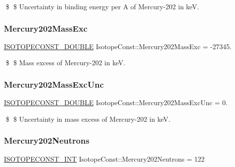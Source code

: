 \$ \$ Uncertainty in binding energy per A of Mercury-\/202 in keV. \mbox{\label{group___isotope_const-_mercury-_hg202_ga077138db374644ae16c107581ff498a1}} 
\subsubsection{\texorpdfstring{Mercury202\+Mass\+Exc}{Mercury202MassExc}}
{\footnotesize\ttfamily \mbox{\hyperlink{group___isotope_const-_macros_ga8f45a7272ce02c0b4c65c44636ed719a}{I\+S\+O\+T\+O\+P\+E\+C\+O\+N\+S\+T\+\_\+\+D\+O\+U\+B\+LE}} Isotope\+Const\+::\+Mercury202\+Mass\+Exc = -\/27345.}

\$ \$ Mass excess of Mercury-\/202 in keV. \mbox{\label{group___isotope_const-_mercury-_hg202_ga183bf624fa3b6276b30b1d95c868ab25}} 
\subsubsection{\texorpdfstring{Mercury202\+Mass\+Exc\+Unc}{Mercury202MassExcUnc}}
{\footnotesize\ttfamily \mbox{\hyperlink{group___isotope_const-_macros_ga8f45a7272ce02c0b4c65c44636ed719a}{I\+S\+O\+T\+O\+P\+E\+C\+O\+N\+S\+T\+\_\+\+D\+O\+U\+B\+LE}} Isotope\+Const\+::\+Mercury202\+Mass\+Exc\+Unc = 0.}

\$ \$ Uncertainty in mass excess of Mercury-\/202 in keV. \mbox{\label{group___isotope_const-_mercury-_hg202_ga35753fe9fcd75ae17797db5664ff4073}} 
\subsubsection{\texorpdfstring{Mercury202\+Neutrons}{Mercury202Neutrons}}
{\footnotesize\ttfamily \mbox{\hyperlink{group___isotope_const-_macros_ga5f18360b3e99483a35c32d789e62621c}{I\+S\+O\+T\+O\+P\+E\+C\+O\+N\+S\+T\+\_\+\+I\+NT}} Isotope\+Const\+::\+Mercury202\+Neutrons = 122}

